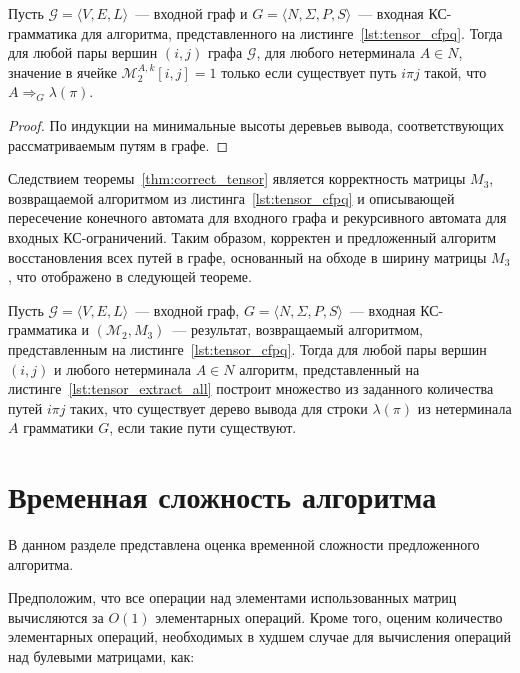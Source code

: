 \begin{theorem}\label{thm:correct_tensor}
	Пусть $\mathcal{G} = \langle V, E, L \rangle$~--- входной граф и $G = \langle N, \Sigma, P, S \rangle$~--- входная КС-грамматика для алгоритма, представленного на листинге~\ref{lst:tensor_cfpq}. Тогда для любой пары вершин $(i, j)$ графа $\mathcal{G}$, для любого нетерминала $A \in N$, значение в ячейке $\mathcal{M}_2^{A, k}[i, j] = 1$ только если существует путь $i \pi j$ такой, что $A \Rightarrow_G \lambda(\pi)$.
\end{theorem}
\begin{proof}
По индукции на минимальные высоты деревьев вывода, соответствующих рассматриваемым путям в графе.
\end{proof}

Следствием теоремы~\ref{thm:correct_tensor} является корректность матрицы $M_3$, возвращаемой алгоритмом из листинга~\ref{lst:tensor_cfpq} и описывающей пересечение конечного автомата для входного графа и рекурсивного автомата для входных КС-ограничений. Таким образом, корректен и предложенный алгоритм восстановления всех путей в графе, основанный на обходе в ширину матрицы $M_3$, что отображено в следующей теореме.

\begin{theorem}\label{thm:correct_extraction_single_all_tensor}
	Пусть $\mathcal{G} = \langle V, E, L \rangle$~--- входной граф, $G = \langle N, \Sigma, P, S \rangle$~--- входная КС-грамматика и $(\mathcal{M}_2, M_3)$~--- результат, возвращаемый алгоритмом, представленным на листинге~\ref{lst:tensor_cfpq}. Тогда для любой пары вершин $(i, j)$ и любого нетерминала $A \in N$ алгоритм, представленный на листинге~\ref{lst:tensor_extract_all} построит множество из заданного количества путей $i \pi j$ таких, что существует дерево вывода для строки $\lambda(\pi)$ из нетерминала $A$ грамматики $G$, если такие пути существуют.
\end{theorem}

\section{Временная сложность алгоритма}\label{sec:ch4/sect3}
В данном разделе представлена оценка временной сложности предложенного алгоритма.

Предположим, что все операции над элементами использованных матриц вычисляются за $O(1)$ элементарных операций. Кроме того, оценим количество элементарных операций, необходимых в худшем случае для вычисления операций над булевыми матрицами, как:

